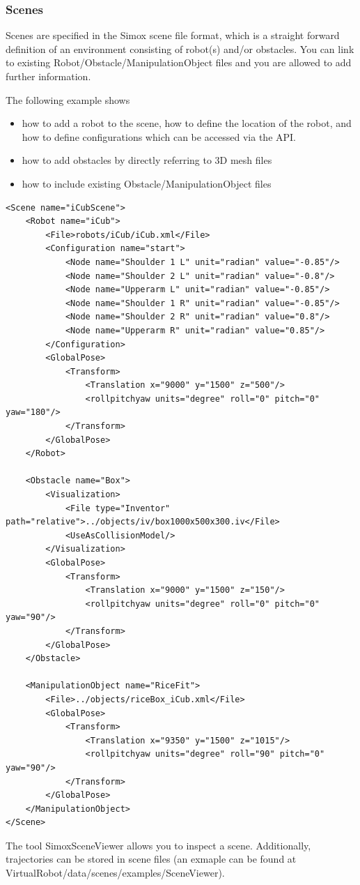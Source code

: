 \subsubsection{Scenes}
Scenes are specified in the Simox scene file format, which is a straight forward definition of an environment consisting of robot(s) and/or obstacles. You can link to existing Robot/Obstacle/ManipulationObject files and you are allowed to add further information.
\par
The following example shows 
\begin{itemize}
\item how to add a robot to the scene, how to define the location of the robot, and how to define configurations which can be accessed via the API.
\item how to add obstacles by directly referring to 3D mesh files
\item how to include existing Obstacle/ManipulationObject files
\end{itemize}
\begin{lstlisting}
<Scene name="iCubScene">
    <Robot name="iCub">
        <File>robots/iCub/iCub.xml</File>
        <Configuration name="start">
            <Node name="Shoulder 1 L" unit="radian" value="-0.85"/>
            <Node name="Shoulder 2 L" unit="radian" value="-0.8"/>
            <Node name="Upperarm L" unit="radian" value="-0.85"/>
            <Node name="Shoulder 1 R" unit="radian" value="-0.85"/>
            <Node name="Shoulder 2 R" unit="radian" value="0.8"/>
            <Node name="Upperarm R" unit="radian" value="0.85"/>
        </Configuration>
        <GlobalPose>
            <Transform>
                <Translation x="9000" y="1500" z="500"/>
                <rollpitchyaw units="degree" roll="0" pitch="0" yaw="180"/>
            </Transform>
        </GlobalPose>
    </Robot>

    <Obstacle name="Box">
        <Visualization>
            <File type="Inventor" path="relative">../objects/iv/box1000x500x300.iv</File>
            <UseAsCollisionModel/>
        </Visualization>
        <GlobalPose>
            <Transform>
                <Translation x="9000" y="1500" z="150"/>
                <rollpitchyaw units="degree" roll="0" pitch="0" yaw="90"/>
            </Transform>
        </GlobalPose>
    </Obstacle>

    <ManipulationObject name="RiceFit">
        <File>../objects/riceBox_iCub.xml</File>
        <GlobalPose>
            <Transform>
                <Translation x="9350" y="1500" z="1015"/>
                <rollpitchyaw units="degree" roll="90" pitch="0" yaw="90"/>
            </Transform>
        </GlobalPose>
    </ManipulationObject>
</Scene>
\end{lstlisting}
The tool SimoxSceneViewer allows you to inspect a scene. Additionally, trajectories can be stored in scene files (an exmaple can be found at VirtualRobot/data/scenes/examples/SceneViewer).
